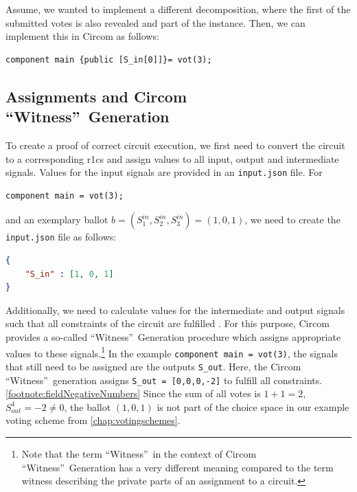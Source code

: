 Assume, we wanted to implement a different decomposition, where the first of the submitted votes is also revealed and part of the instance.
Then, we can implement this in Circom as follows:

\begin{lstlisting}[language=Circom]
    component main {public [S_in[0]]}= vot(3);
\end{lstlisting}

\subsection{Assignments and Circom ``Witness''\ Generation}
To create a proof of correct circuit execution, we first need to convert the circuit to a corresponding \gls{r1cs} and assign values to all input, output and intermediate signals.
Values for the input signals are provided in an \verb|input.json| file.
For 
\begin{lstlisting}[language=Circom]
    component main = vot(3);
\end{lstlisting}
and an exemplary ballot $b=(S_1^{in}, S_2^{in}, S_3^{in})=(1,0,1)$, we need to create the \verb|input.json| file as follows:

\newpage
\begin{lstlisting}[language=json]
{
    "S_in" : [1, 0, 1]
}\end{lstlisting}

Additionally, we need to calculate values for the intermediate and output signals such that all constraints of the circuit are fulfilled \cite{rodriguez_circom_2025}.
For this purpose, Circom provides a so-called ``Witness''\ Generation procedure which assigns appropriate values to these signals.\footnote{
    \label{footnote:circomWitness}
    Note that the term ``Witness''\ in the context of Circom ``Witness''\ Generation has a very different meaning compared to the term witness describing the private parts of an assignment to a circuit.
}
In the example \verb|component main = vot(3)|, the signals that still need to be assigned are the outputs \verb|S_out|.
Here, the Circom ``Witness''\ generation assigns \verb|S_out = [0,0,0,-2]| to fulfill all constraints.\cref{footnote:fieldNegativeNumbers}
Since the sum of all votes is $1+1=2$, $S_{out}^4=-2\neq 0$, the ballot $(1,0,1)$ is not part of the choice space in our example voting scheme from \cref{chap:votingschemes}.

